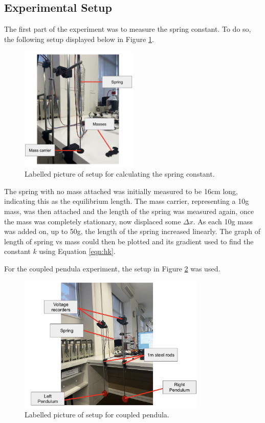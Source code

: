 \documentclass{article}
\begin{document}
\subsection{Experimental Setup}
The first part of the experiment was to measure the spring constant. To do so,
the following setup displayed below in Figure \ref{fig:kexp}. 
\begin{figure}[H] 
    \centering
    \includegraphics[width=0.5\textwidth]{setup1.png}
    \caption{Labelled picture of setup for calculating the spring constant.}
    \label{fig:kexp}
\end{figure}

The spring with no mass attached was initially measured to be 16cm long, indicating
this as the equilibrium length. The mass carrier, representing a 10g mass, was then 
attached and the length of the spring was measured again, once the mass was completely 
stationary, now displaced some $\Delta x$. As each 10g mass was added on, up to 50g, 
the length of the spring increased linearly. The graph of length of spring vs mass 
could then be plotted and its gradient used to find the constant $k$ using Equation 
\ref{eqn:hk}.

For the coupled pendula experiment, the setup in Figure \ref{fig:exp} was used. 
\begin{figure}[H] 
    \centering
    \includegraphics[width=0.8\textwidth]{setup2.png}
    \caption{Labelled picture of setup for coupled pendula.}
    \label{fig:exp}
\end{figure}
\end{document}
